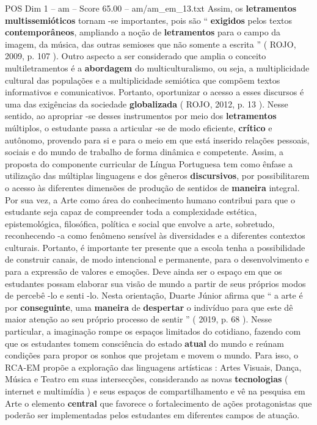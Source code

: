 \begin{textsample}{POS Dim 1 – am – Score 65.00 – am/am\_em\_13.txt}
Assim, os \textbf{letramentos} \textbf{multissemióticos} tornam -se importantes, pois são “ \textbf{exigidos} pelos textos \textbf{contemporâneos}, ampliando a noção de \textbf{letramentos} para o campo da imagem, da música, das outras semioses que não somente a escrita ” ( ROJO, 2009, p. 107 ).
Outro aspecto a ser considerado que amplia o conceito multiletramentos é a \textbf{abordagem} do multiculturalismo, ou seja, a multiplicidade cultural das populações e a multiplicidade semiótica que compõem textos informativos e comunicativos.
Portanto, oportunizar o acesso a esses discursos é uma das exigências da sociedade \textbf{globalizada} ( ROJO, 2012, p. 13 ).
Nesse sentido, ao apropriar -se desses instrumentos por meio dos \textbf{letramentos} múltiplos, o estudante passa a articular -se de modo eficiente, \textbf{crítico} e autônomo, provendo para si e para o meio em que está inserido relações pessoais, sociais e do mundo de trabalho de forma dinâmica e competente.
Assim, a proposta do componente curricular de Língua Portuguesa tem como ênfase a utilização das múltiplas linguagens e dos gêneros \textbf{discursivos}, por possibilitarem o acesso às diferentes dimensões de produção de sentidos de \textbf{maneira} integral.
Por sua vez, a Arte como área do conhecimento humano contribui para que o estudante seja capaz de compreender toda a complexidade estética, epistemológica, filosófica, política e social que envolve a arte, sobretudo, reconhecendo -a como fenômeno sensível às diversidades e a diferentes contextos culturais.
Portanto, é importante ter presente que a escola tenha a possibilidade de construir canais, de modo intencional e permanente, para o desenvolvimento e para a expressão de valores e emoções.
Deve ainda ser o espaço em que os estudantes possam elaborar sua visão de mundo a partir de seus próprios modos de percebê -lo e senti -lo.
Nesta orientação, Duarte Júnior afirma que “ a arte é por \textbf{conseguinte}, uma \textbf{maneira} de \textbf{despertar} o indivíduo para que este dê maior atenção ao seu próprio processo de sentir ” ( 2019, p. 68 ).
Nesse particular, a imaginação rompe os espaços limitados do cotidiano, fazendo com que os estudantes tomem consciência do estado \textbf{atual} do mundo e reúnam condições para propor os sonhos que projetam e movem o mundo.
Para isso, o RCA-EM propõe a exploração das linguagens artísticas : Artes Visuais, Dança, Música e Teatro em suas intersecções, considerando as novas \textbf{tecnologias} ( internet e multimídia ) e seus espaços de compartilhamento e vê na pesquisa em Arte o elemento \textbf{central} que favorece o fortalecimento de ações protagonistas que poderão ser implementadas pelos estudantes em diferentes campos de atuação.

\end{textsample}

